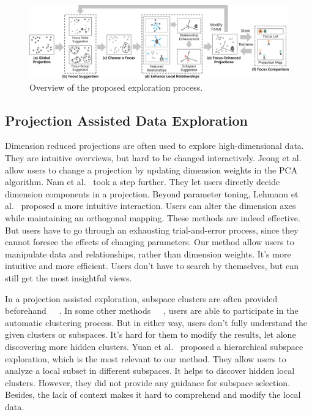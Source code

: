 \begin{figure}[htbp]
\centering
  \includegraphics[width=1\linewidth]{images/new_pipeline.eps}%
  \caption{Overview of the proposed exploration process.}
\label{fig:workflow}
  \end{figure}

\subsection{Projection Assisted Data Exploration}
Dimension reduced projections are often used to explore high-dimensional data. They are intuitive overviews, but hard to be changed interactively. Jeong et al.~\cite{DBLP:journals/cgf/JeongZFRC09} allow users to change a projection by updating dimension weights in the PCA algorithm. Nam et al.~\cite{DBLP:journals/tvcg/NamM13} took a step further. They let users directly decide dimension components in a projection. Beyond parameter toning, Lehmann et al.~\cite{DBLP:journals/tvcg/LehmannT13} proposed a more intuitive interaction. Users can alter the dimension axes while maintaining an orthogonal mapping. These methods are indeed effective. But users have to go through an exhausting trial-and-error process, since they cannot foresee the effects of changing parameters. Our method allow users to manipulate data and relationships, rather than dimension weights. It's more intuitive and more efficient. Users don't have to search by themselves, but can still get the most insightful views.

In a projection assisted exploration, subspace clusters are often provided beforehand~\cite{DBLP:conf/ieeevast/TatuMFBSSK12}~\cite{DBLP:journals/tvcg/NamM13}~\cite{DBLP:journals/cgf/LiuWTBP15}. In some other methods~\cite{DBLP:journals/tois/ChenL06}~\cite{DBLP:conf/ieeevast/NamHMZI07}~\cite{DBLP:conf/ieeevast/TatuMFBSSK12}, users are able to participate in the automatic clustering process. But in either way, users don't fully understand the given clusters or subspaces. It's hard for them to modify the results, let alone discovering more hidden clusters. Yuan et al.~\cite{DBLP:journals/tvcg/YuanRWG13} proposed a hierarchical subspace exploration, which is the most relevant to our method. They allow users to analyze a local subset in different subspaces. It helps to discover hidden local clusters. However, they did not provide any guidance for subspace selection. Besides, the lack of context makes it hard to comprehend and modify the local data.

